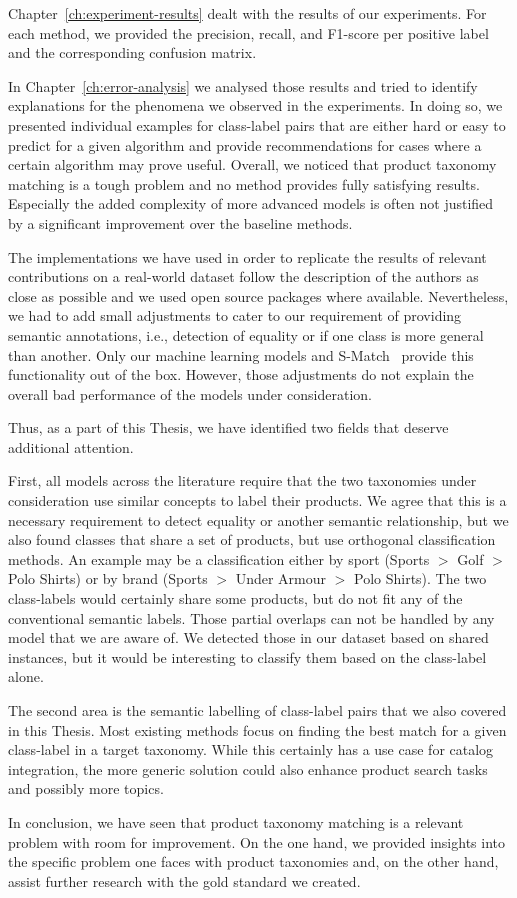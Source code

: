 Chapter~\ref{ch:experiment-results} dealt with the results of our experiments.
For each method, we provided the precision, recall, and F1-score per positive label and the corresponding confusion
matrix.

In Chapter~\ref{ch:error-analysis} we analysed those results and tried to identify explanations for the phenomena
we observed in the experiments.
In doing so, we presented individual examples for class-label pairs that are either hard or easy to predict for a given algorithm and
provide recommendations for cases where a certain algorithm may prove useful.
Overall, we noticed that product taxonomy matching is a tough problem and no method provides fully satisfying
results.
Especially the added complexity of more advanced models is often not justified by a significant improvement over the
baseline methods.

The implementations we have used in order to replicate the results of relevant contributions on a real-world dataset
follow the description of the authors as close as possible and we used open source packages where available.
Nevertheless, we had to add small adjustments  to cater to our requirement of providing semantic annotations, i.e., detection
of equality or if one class is more general than another.
Only our machine learning models and S-Match~\cite{giunchiglia2005semantic} provide this functionality out of the box.
However, those adjustments do not explain the overall bad performance of the models under consideration.

Thus, as a part of this Thesis, we have identified two fields that deserve additional attention.

First, all models across the literature require that the two taxonomies under consideration use similar concepts to
label their products.
We agree that this is a necessary requirement to detect equality or another semantic relationship, but we also found classes
that share a set of products, but use orthogonal classification methods.
An example may be a classification either by sport (Sports $>$ Golf $>$ Polo Shirts) or by brand (Sports $>$ Under Armour $>$ Polo Shirts).
The two class-labels would certainly share some products, but do not fit any of the conventional semantic labels.
Those partial overlaps can not be handled by any model that we are aware of.
We detected those in our dataset based on shared instances, but it would be interesting to classify them based on the
class-label alone.

The second area is the semantic labelling of class-label pairs that we also covered in this Thesis.
Most existing methods focus on finding the best match for a given class-label in a target taxonomy.
While this certainly has a use case for catalog integration, the more generic solution could also enhance product
search tasks and possibly more topics.

In conclusion, we have seen that product taxonomy matching is a relevant problem with room for improvement.
On  the one hand, we provided insights into the specific problem one faces with product taxonomies and,
on the other hand, assist further research with the gold standard we created.

